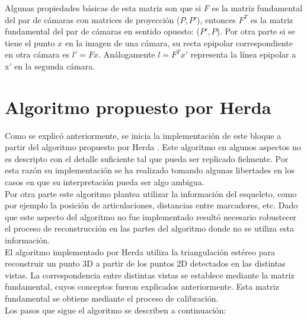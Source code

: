 Algunas propiedades básicas de esta matriz son que si $F$ es la matriz fundamental del par de cámaras con matrices de proyección ($P,P'$), entonces $F^T$ es la matriz fundamental del par de cámaras en sentido opuesto: ($P',P$). Por otra parte si se tiene el punto $x$ en la imagen de una cámara, su recta epipolar correspondiente en otra cámara es $l'=Fx$. Análogamente $l=F^Tx'$ representa la línea epipolar a x' en la segunda cámara.

\section{Algoritmo propuesto por Herda }

Como se explicó anteriormente, se inicia la implementación de este bloque a partir del algoritmo propuesto por Herda \cite{herda}. Este algoritmo en algunos aspectos no es descripto con el detalle suficiente tal que pueda ser replicado fielmente. Por esta razón su implementación se ha realizado tomando algunas libertades en los casos en que su interpretación pueda ser algo ambigua.\\

Por otra parte este algoritmo plantea utilizar la información del esqueleto, como por ejemplo la posición de articulaciones, distancias entre marcadores, etc. Dado que este aspecto del algoritmo no fue implementado resultó necesario robustecer el proceso de reconstrucción en las partes del algoritmo donde no se utiliza esta información.\\


El algoritmo implementado por Herda utiliza la triangulación estéreo para reconstruir un punto 3D a partir de los puntos 2D detectados en las distintas vistas. La correspondencia entre distintas vistas se establece mediante la matriz fundamental, cuyos conceptos fueron explicados anteriormente. Esta matriz fundamental se obtiene mediante el proceso de calibración.\\

Los pasos que sigue el algoritmo se describen a continuación:\

